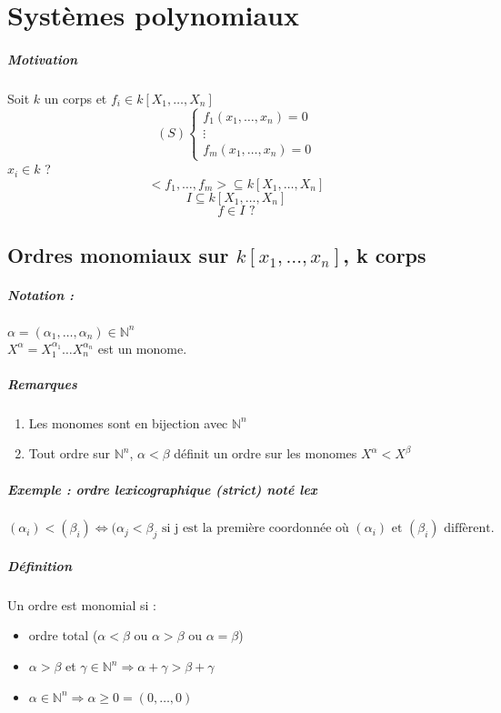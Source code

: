 \documentclass[12pt,a4paper]{report}
\begin{document}
\chapter{Systèmes polynomiaux\\}
\paragraph{Motivation\\}
Soit $k$ un corps et $f_i \in k[X_1,\ldots,X_n]$
$$ (S) \left\{\begin{array}{c}
f_1(x_1,\ldots,x_n) = 0 \\
\vdots \\
f_m(x_1,\ldots,x_n) = 0 \end{array}\right. $$
$x_i \in k $ ?\\
$$<f_1,\ldots,f_m> \subseteq k[X_1,\ldots,X_n]$$
$$ I \subseteq k[X_1,\ldots,X_n]$$
$$f \in I \mbox{ ?} $$
\section{Ordres monomiaux sur $k[x_1,\ldots,x_n]$, k corps}
\paragraph{Notation :} $\alpha = (\alpha_1,\ldots,\alpha_n) \in \mathbb{N}^n $\\
$ X^{\alpha} = X_1^{\alpha_1}\ldots X_n^{\alpha_n}$ est un monome.
\paragraph{Remarques}
\begin{enumerate}
\item Les monomes sont en bijection avec $ \mathbb{N}^n$
\item Tout ordre sur $ \mathbb{N}^n$, $ \alpha < \beta $ définit un ordre sur les monomes $X^{\alpha} < X^{\beta} $
\end{enumerate}
\paragraph{Exemple : ordre lexicographique (strict) noté lex}
$$ (\alpha_i) < (\beta_i) \Longleftrightarrow (\alpha_j < \beta_j \mbox{ si j est la première coordonnée où } (\alpha_i) \mbox{ et } (\beta_i) \mbox{ diffèrent.} $$
\paragraph{Définition\\}
Un ordre est monomial si :
\begin{itemize}
\item ordre total ($\alpha < \beta$ ou $ \alpha > \beta$ ou $\alpha = \beta$)
\item $\alpha > \beta$ et $\gamma \in \mathbb{N}^n \Rightarrow \alpha + \gamma > \beta + \gamma $
\item $ \alpha \in \mathbb{N}^n \Rightarrow \alpha \geqslant 0 = (0, \ldots, 0)$
\end{itemize}
\end{document}
